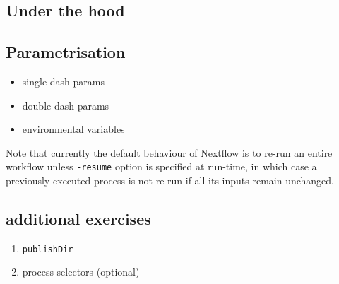 \subsection {Under the hood}



\subsection{Parametrisation}

\begin{itemize}
 \item single dash params
 \item double dash params
 \item environmental variables
\end{itemize}

\begin{note}
Note that currently the default behaviour of Nextflow is to re-run an entire workflow 
unless \texttt{-resume} option is specified at run-time, in which case a previously 
executed process is not re-run if all its inputs remain unchanged.

\end{note}


\subsection{additional exercises}

\begin{enumerate}
 \item \texttt{publishDir}
 \item process selectors (optional)
\end{enumerate}


%
%
%
%
%
%
%
%
%

